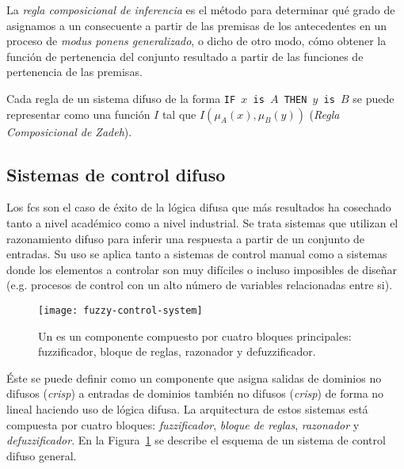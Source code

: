 La \textit{regla composicional de inferencia} es el método para determinar qué grado de asignamos a un consecuente a partir de las premisas de los antecedentes en un proceso de \textit{modus ponens generalizado}, o dicho de otro modo, cómo obtener la función de pertenencia del conjunto resultado a partir de las funciones de pertenencia de las premisas.

Cada regla de un sistema difuso de la forma \texttt{IF $x$ is $A$ THEN $y$ is $B$} se puede representar como una función $I$ tal que $I(\mu_A(x), \mu_B(y))$ (\textit{Regla Composicional de Zadeh}).

\subsection{Sistemas de control difuso}
\label{ss:fcs}

Los \acrfull{fcs} son el caso de éxito de la lógica difusa que más resultados ha cosechado tanto a nivel académico como a nivel industrial. Se trata sistemas que utilizan el razonamiento difuso para inferir una respuesta a partir de un conjunto de entradas. Su uso se aplica tanto a sistemas de control manual como a sistemas donde los elementos a controlar son muy difíciles o incluso imposibles de diseñar (e.g. procesos de control con un alto número de variables relacionadas entre si).

\begin{figure}
	\centering
	\texttt{[image: fuzzy-control-system]}
	\caption[Esquema de un ]{Un  es un componente compuesto por cuatro bloques principales: fuzzificador, bloque de reglas, razonador y defuzzificador.}
	\label{fig:fuzzy-control-system}
\end{figure}

Éste se puede definir como un componente que asigna salidas de dominios no difusos (\textit{crisp}) a entradas de dominios también no difusos (\textit{crisp}) de forma no lineal haciendo uso de lógica difusa. La arquitectura de estos sistemas está compuesta por cuatro bloques: \textit{fuzzificador}, \textit{bloque de reglas}, \textit{razonador} y \textit{defuzzificador}. En la Figura~\ref{fig:fuzzy-control-system} se describe el esquema de un sistema de control difuso general.

